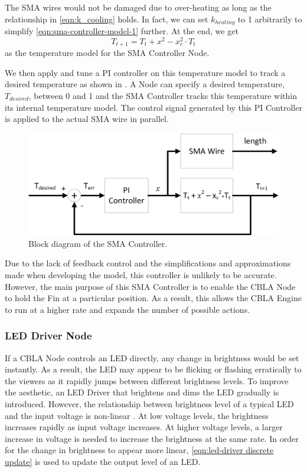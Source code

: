 The SMA wires would not be damaged due to over-heating as long as the relationship in \eqref{eqn:k_cooling} holds. In fact, we can set $k_{heating}$ to 1 arbitrarily to simplify \eqref{eqn:sma-controller-model-1} further. At the end, we get
\begin{equation}\label{eqn:sma-controller-model-2}
T_{t+1} =  T_{t} + x^2 -  x_c^2 \cdot T_{t}
\end{equation}
as the temperature model for the SMA Controller Node.

We then apply and tune a PI controller on this temperature model to track a desired temperature as shown in . A Node can specify a desired temperature, $T_{desired}$, between 0 and 1 and the SMA Controller tracks this temperature within its internal temperature model. The control signal generated by this PI Controller is applied to the actual SMA wire in parallel. 

\begin{figure} [htb]
	\centering
	\includegraphics[width=1.0\textwidth]{"fig/validations/SMA Controller"}
	\caption[Block diagram of the SMA Controller]{Block diagram of the SMA Controller. }
	\label{fig:SMA Controller}
\end{figure}

Due to the lack of feedback control and the simplifications and approximations made when developing the model, this controller is unlikely to be accurate. However, the main purpose of this SMA Controller is to enable the CBLA Node to hold the Fin at a particular position. As a result, this allows the CBLA Engine to run at a higher rate and expands the number of possible actions. 


\subsubsection{LED Driver Node}

If a CBLA Node controls an LED directly, any change in brightness would be set instantly. As a result, the LED may appear to be flicking or flashing erratically to the viewers as it rapidly jumps between different brightness levels. To improve the aesthetic, an LED Driver that brightens and dims the LED gradually is introduced. However, the relationship between brightness level of a typical LED and the input voltage is non-linear \cite{CreeSpecs}. At low voltage levels, the brightness increases rapidly as input voltage increases. At higher voltage levels, a larger increase in voltage is needed to increase the brightness at the same rate. In order for the change in brightness to appear more linear, \eqref{eqn:led-driver discrete update} is used to update the output level of an LED. 

